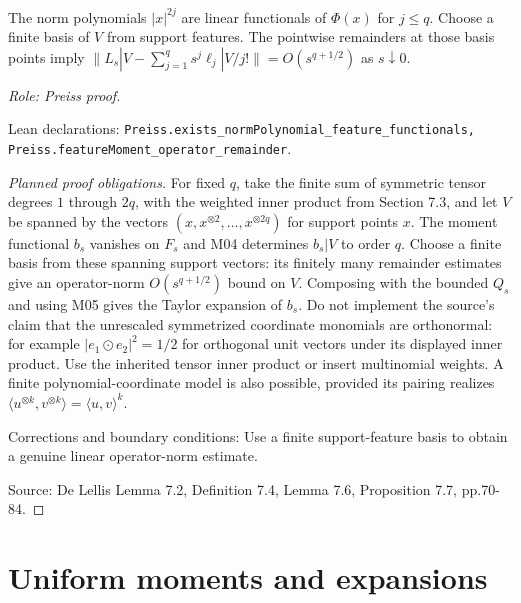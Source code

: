 \begin{lemma}
\label{lem:moment-feature-remainder}







The norm polynomials $|x|^{2j}$ are linear functionals of $\Phi(x)$ for $j\leq q$. Choose a finite basis of $V$ from support features. The pointwise remainders at those basis points imply $\|L_s|V-\sum_{j=1}^q s^j\ell_j|V/j!\|=O(s^{q+1/2})$ as $s\downarrow0$.
\par\emph{Role: Preiss proof.}
\par Lean declarations: \texttt{Preiss.exists\_normPolynomial\_feature\_functionals, Preiss.featureMoment\_operator\_remainder}.
\end{lemma}
\begin{proof}[Planned proof obligations]

For fixed $q$, take the finite sum of symmetric tensor degrees $1$ through
$2q$, with the weighted inner product from Section 7.3, and let $V$ be spanned
by the vectors $(x,x^{\otimes2},\ldots,x^{\otimes2q})$ for support points $x$.
The moment functional $b_s$ vanishes on $F_s$ and M04 determines
$b_s|V$ to order $q$. Choose a finite basis from these spanning support vectors:
its finitely many remainder estimates give an operator-norm
$O(s^{q+1/2})$ bound on $V$. Composing with the bounded $Q_s$ and using M05
gives the Taylor expansion of $b_s$.
Do not implement the source's claim that the unrescaled symmetrized coordinate
monomials are orthonormal: for example
$|e_1\odot e_2|^2=1/2$ for orthogonal unit vectors under its displayed inner
product. Use the inherited tensor inner product or insert multinomial weights.
A finite polynomial-coordinate model is also possible, provided its pairing
realizes $\langle u^{\otimes k},v^{\otimes k}\rangle=\langle u,v\rangle^k$.
\par Corrections and boundary conditions: Use a finite support-feature basis to obtain a genuine linear operator-norm estimate.
\par Source: De Lellis Lemma 7.2, Definition 7.4, Lemma 7.6, Proposition 7.7, pp.70-84.
\end{proof}

\section{Uniform moments and expansions}

